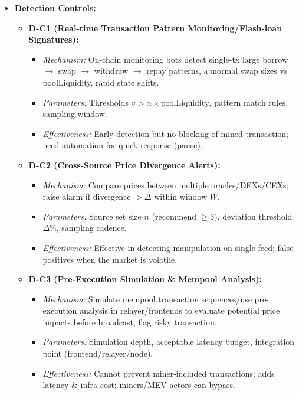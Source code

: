 \begin{itemize}
    \item \textbf{Detection Controls:}
    \begin{itemize}
        \item \textbf{D-C1 (Real-time Transaction Pattern Monitoring/Flash-loan Signatures):}
            \begin{itemize}
                \item \textit{Mechanism:} On-chain monitoring bots detect single-tx large borrow $\rightarrow$ swap $\rightarrow$ withdraw $\rightarrow$ repay patterns, abnormal swap sizes vs poolLiquidity, rapid state shifts. \cite{werapun2023faa}
                \item \textit{Parameters:} Thresholds $v > \alpha \times \text{poolLiquidity}$, pattern match rules, sampling window.
                \item \textit{Effectiveness:} Early detection but no blocking of mined transaction; need automation for quick response (pause).
            \end{itemize}
        \item \textbf{D-C2 (Cross-Source Price Divergence Alerts):}
            \begin{itemize}
                \item \textit{Mechanism:} Compare prices between multiple oracles/DEXs/CEXs; raise alarm if divergence $> \Delta$ within window $W$. \cite{eskandari2021sok}
                \item \textit{Parameters:} Source set size $n$ (recommend $\geq 3$), deviation threshold $\Delta\%$, sampling cadence.
                \item \textit{Effectiveness:} Effective in detecting manipulation on single feed; false positives when the market is volatile.
            \end{itemize}
        \item \textbf{D-C3 (Pre-Execution Simulation \& Mempool Analysis):}
            \begin{itemize}
                \item \textit{Mechanism:} Simulate mempool transaction sequences/use pre-execution analysis in relayer/frontends to evaluate potential price impacts before broadcast; flag risky transaction. \cite{alhaidari2025protecting}
                \item \textit{Parameters:} Simulation depth, acceptable latency budget, integration point (frontend/relayer/node).
                \item \textit{Effectiveness:} Cannot prevent miner-included transactions; adds latency \& infra cost; miners/MEV actors can bypass.
            \end{itemize}
    \end{itemize}
\end{itemize}

